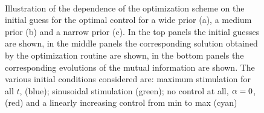 \documentclass{article}
\begin{document}
\begin{figure}[h]
\begin{center}
\\
\caption[Dependence on initial guess for control]{Illustration of the dependence
of the optimization scheme on the initial guess for the optimal
control for a wide prior (a), a medium prior (b) and a narrow prior (c). 
In the top panels the initial guesses are shown, in the middle
panels the corresponding solution obtained by the optimization routine
are shown,
in the bottom panels the corresponding evolutions of the mutual
information are shown.
The various initial conditions considered are: maximum stimulation for all $t$,
(blue); sinusoidal stimulation (green); no control at all, ${\alpha}=0$, (red) and a
linearly increasing control from min to max (cyan)}
\label{fig:ICs_for_control}
\end{center}
\end{figure}
\end{document}
